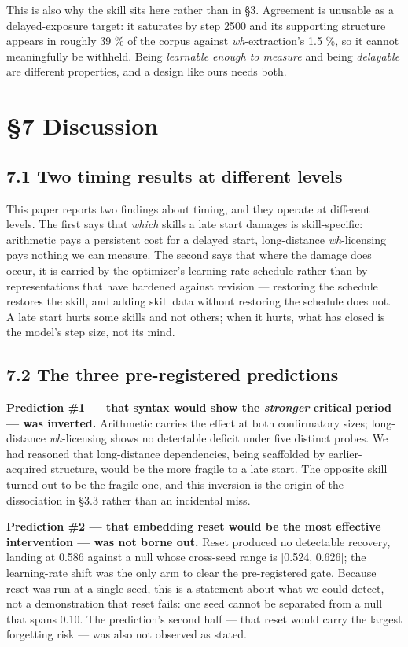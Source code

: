 \documentclass{article}
\begin{document}
This is also why the skill sits here rather than in §3. Agreement is unusable as a
delayed-exposure target: it saturates by step 2500 and its supporting structure appears in
roughly 39 \% of the corpus against \emph{wh}-extraction's 1.5 \%, so it cannot meaningfully be
withheld. Being \emph{learnable enough to measure} and being \emph{delayable} are different properties,
and a design like ours needs both.

\section{§7 Discussion}\label{discussion}

\subsection{7.1 Two timing results at different levels}\label{two-timing-results-at-different-levels}

This paper reports two findings about timing, and they operate at different levels. The
first says that \emph{which} skills a late start damages is skill-specific: arithmetic pays a
persistent cost for a delayed start, long-distance \emph{wh}-licensing pays nothing we can
measure. The second says that where the damage does occur, it is carried by the optimizer's
learning-rate schedule rather than by representations that have hardened against revision ---
restoring the schedule restores the skill, and adding skill data without restoring the
schedule does not. A late start hurts some skills and not others; when it hurts, what has
closed is the model's step size, not its mind.

\subsection{7.2 The three pre-registered predictions}\label{the-three-pre-registered-predictions}

\textbf{Prediction \#1 --- that syntax would show the \emph{stronger} critical period --- was inverted.}
Arithmetic carries the effect at both confirmatory sizes; long-distance \emph{wh}-licensing shows
no detectable deficit under five distinct probes. We had reasoned that long-distance
dependencies, being scaffolded by earlier-acquired structure, would be the more fragile to a
late start. The opposite skill turned out to be the fragile one, and this inversion is the
origin of the dissociation in §3.3 rather than an incidental miss.

\textbf{Prediction \#2 --- that embedding reset would be the most effective intervention --- was not
borne out.} Reset produced no detectable recovery, landing at 0.586 against a null whose
cross-seed range is {[}0.524, 0.626{]}; the learning-rate shift was the only arm to clear the
pre-registered gate. Because reset was run at a single seed, this is a statement about what
we could detect, not a demonstration that reset fails: one seed cannot be separated from a
null that spans 0.10. The prediction's second half --- that reset would carry the largest
forgetting risk --- was also not observed as stated.
\end{document}
